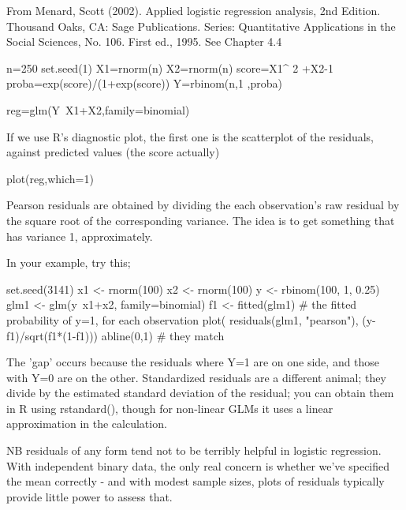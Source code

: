 From Menard, Scott (2002). Applied logistic regression analysis, 2nd Edition. Thousand Oaks, CA: Sage Publications. Series: Quantitative Applications in the Social Sciences, No. 106. First ed., 1995. See Chapter 4.4


n=250
set.seed(1)
X1=rnorm(n)
X2=rnorm(n)
score=X1^ 2 +X2-1
proba=exp(score)/(1+exp(score))
Y=rbinom(n,1 ,proba)

reg=glm(Y~X1+X2,family=binomial)


If we use R’s diagnostic plot, the first one is the scatterplot of the residuals, against predicted values (the score actually)

plot(reg,which=1)





Pearson residuals are obtained by dividing the each observation's raw residual by the square root of the corresponding variance. 
The idea is to get something that has variance 1, approximately. 

In your example, try this;

set.seed(3141)
x1 <- rnorm(100)
x2 <- rnorm(100)
y <- rbinom(100, 1, 0.25)
glm1 <- glm(y~x1+x2, family=binomial)
f1 <- fitted(glm1) # the fitted probability of y=1, for each observation
plot( residuals(glm1, "pearson"), (y-f1)/sqrt(f1*(1-f1)))
abline(0,1)        # they match

The 'gap' occurs because the residuals where Y=1 are on one side, and those with Y=0 are on the other. 
Standardized residuals are a different animal; they divide by the estimated standard deviation of the residual; you can obtain them in R using rstandard(), though for non-linear GLMs it uses a linear approximation in the calculation.

NB residuals of any form tend not to be terribly helpful in logistic regression. 
With independent binary data, the only real concern is whether we've specified the mean correctly - and with modest sample sizes, plots of residuals typically provide little power to assess that.
